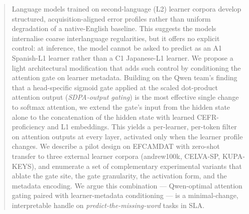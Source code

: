 \begin{abstract}
Language models trained on second-language (L2) learner corpora develop
structured, acquisition-aligned error profiles rather than uniform
degradation of a native-English baseline. This suggests the models
internalise coarse interlanguage regularities, but it offers no explicit
control: at inference, the model cannot be asked to predict as an A1
Spanish-L1 learner rather than a C1 Japanese-L1 learner. We propose a
light architectural modification that adds such control by conditioning
the attention gate on learner metadata. Building on the Qwen team's
finding that a head-specific sigmoid gate applied at the scaled
dot-product attention output (\emph{SDPA-output gating}) is the most
effective single change to softmax attention, we extend the gate's input
from the hidden state alone to the concatenation of the hidden state
with learned CEFR-proficiency and L1 embeddings. This yields a
per-learner, per-token filter on attention outputs at every layer,
activated only when the learner profile changes. We describe a pilot
design on EFCAMDAT with zero-shot transfer to three external learner
corpora (andrew100k, CELVA-SP, KUPA-KEYS), and enumerate a set of
complementary experimental variants that ablate the gate site, the gate
granularity, the activation form, and the metadata encoding. We argue
this combination --- Qwen-optimal attention gating paired with
learner-metadata conditioning --- is a minimal-change, interpretable
handle on \emph{predict-the-missing-word} tasks in SLA.
\end{abstract}
